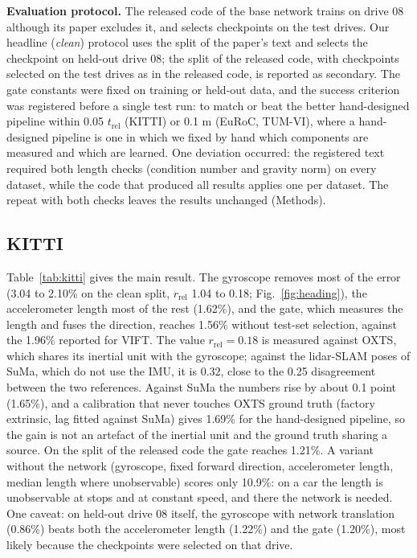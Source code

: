 \documentclass[pdflatex,sn-nature]{sn-jnl}
\begin{document}
\textbf{Evaluation protocol.} The released code of the base network trains on drive 08 although its paper excludes it, and selects checkpoints on the test drives. Our headline (\emph{clean}) protocol uses the split of the paper's text and selects the checkpoint on held-out drive 08; the split of the released code, with checkpoints selected on the test drives as in the released code, is reported as secondary. The gate constants were fixed on training or held-out data, and the success criterion was registered before a single test run: to match or beat the better hand-designed pipeline within 0.05 $t_\mathrm{rel}$ (KITTI) or 0.1 m (EuRoC, TUM-VI), where a hand-designed pipeline is one in which we fixed by hand which components are measured and which are learned. One deviation occurred: the registered text required both length checks (condition number and gravity norm) on every dataset, while the code that produced all results applies one per dataset. The repeat with both checks leaves the results unchanged (Methods).

\subsection{KITTI}

Table~\ref{tab:kitti} gives the main result. The gyroscope removes most of the error (3.04 to 2.10\% on the clean split, $r_\mathrm{rel}$ 1.04 to 0.18; Fig.~\ref{fig:heading}), the accelerometer length most of the rest (1.62\%), and the gate, which measures the length and fuses the direction, reaches 1.56\% without test-set selection, against the 1.96\% reported for VIFT. The value $r_\mathrm{rel}=0.18$ is measured against OXTS, which shares its inertial unit with the gyroscope; against the lidar-SLAM poses of SuMa\cite{Behley2018}, which do not use the IMU, it is 0.32, close to the 0.25 disagreement between the two references. Against SuMa the numbers rise by about 0.1 point (1.65\%), and a calibration that never touches OXTS ground truth (factory extrinsic, lag fitted against SuMa) gives 1.69\% for the hand-designed pipeline, so the gain is not an artefact of the inertial unit and the ground truth sharing a source. On the split of the released code the gate reaches 1.21\%. A variant without the network (gyroscope, fixed forward direction, accelerometer length, median length where unobservable) scores only 10.9\%: on a car the length is unobservable at stops and at constant speed, and there the network is needed. One caveat: on held-out drive 08 itself, the gyroscope with network translation (0.86\%) beats both the accelerometer length (1.22\%) and the gate (1.20\%), most likely because the checkpoints were selected on that drive.
\end{document}
